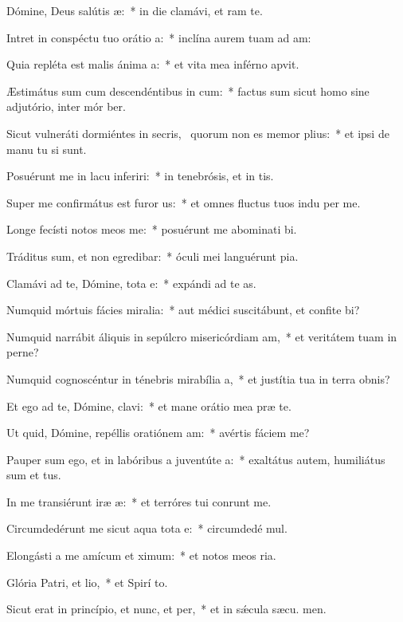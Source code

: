 \item Dómine, Deus salútis æ:~* in die clamávi, et  ram te.
\item Intret in conspéctu tuo orátio a:~* inclína aurem tuam ad  am:
\item Quia repléta est malis ánima a:~* et vita mea inférno apvit.
\item Æstimátus sum cum descendéntibus in cum:~* factus sum sicut homo sine adjutório, inter mór ber.
\item Sicut vulneráti dormiéntes in secris,~\pscross{} quorum non es memor plius:~* et ipsi de manu tu si sunt.
\item Posuérunt me in lacu inferiri:~* in tenebrósis, et in  tis.
\item Super me confirmátus est furor us:~* et omnes fluctus tuos indu per me.
\item Longe fecísti notos meos  me:~* posuérunt me abominati bi.
\item Tráditus sum, et non egredibar:~* óculi mei languérunt  pia.
\item Clamávi ad te, Dómine, tota e:~* expándi ad te  as.
\item Numquid mórtuis fácies miralia:~* aut médici suscitábunt, et confite bi?
\item Numquid narrábit áliquis in sepúlcro misericórdiam am,~* et veritátem tuam in perne?
\item Numquid cognoscéntur in ténebris mirabília a,~* et justítia tua in terra obnis?
\item Et ego ad te, Dómine, clavi:~* et mane orátio mea præ te.
\item Ut quid, Dómine, repéllis oratiónem am:~* avértis fáciem   me?
\item Pauper sum ego, et in labóribus a juventúte a:~* exaltátus autem, humiliátus sum et tus.
\item In me transiérunt iræ æ:~* et terróres tui conrunt me.
\item Circumdedérunt me sicut aqua tota e:~* circumdedé  mul.
\item Elongásti a me amícum et ximum:~* et notos meos  ria.
\item Glória Patri, et lio,~* et Spirí to.
\item Sicut erat in princípio, et nunc, et per,~* et in sǽcula sæcu. men.

